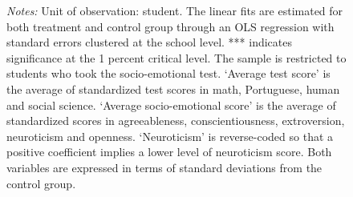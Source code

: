 \documentclass[11pt,a4paper]{article}
\begin{document}
\begin{figure}[htbp]
    \centering
    \begin{minipage}{0.9\textwidth}
        \footnotesize{\textit{Notes:} Unit of observation: student. The linear fits are estimated for both treatment and control group through an OLS regression with standard errors clustered at the school level. *** indicates significance at the 1 percent critical level. The sample is restricted to students who took the socio-emotional test. `Average test score' is the average of standardized test scores in math, Portuguese, human and social science. `Average socio-emotional score' is the average of standardized scores in agreeableness, conscientiousness, extroversion, neuroticism and openness. `Neuroticism' is reverse-coded so that a positive coefficient implies a lower level of neuroticism score. Both variables are expressed in terms of standard deviations from the control group.}
    \end{minipage}
        
\end{figure}
\end{document}
